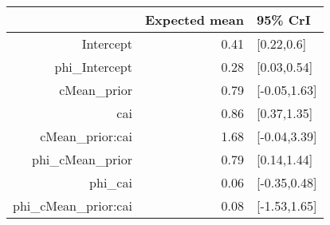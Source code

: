 \begin{tabular}{rrl}
  \hline
 & Expected mean & 95\% CrI \\ 
  \hline
Intercept & 0.41 & [0.22,0.6] \\ 
  phi\_Intercept & 0.28 & [0.03,0.54] \\ 
  cMean\_prior & 0.79 & [-0.05,1.63] \\ 
  cai & 0.86 & [0.37,1.35] \\ 
  cMean\_prior:cai & 1.68 & [-0.04,3.39] \\ 
  phi\_cMean\_prior & 0.79 & [0.14,1.44] \\ 
  phi\_cai & 0.06 & [-0.35,0.48] \\ 
  phi\_cMean\_prior:cai & 0.08 & [-1.53,1.65] \\ 
   \hline
\end{tabular}

